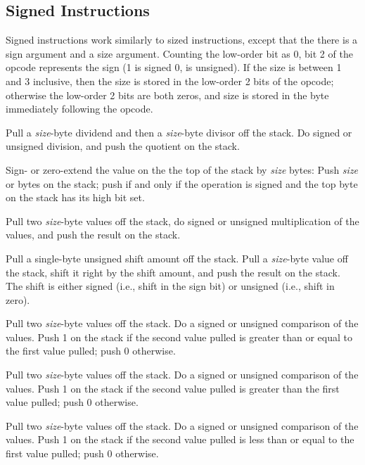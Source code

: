 \documentclass[10pt]{article}
\begin{document}
\subsection{Signed Instructions}

Signed instructions work similarly to sized instructions, except that
the there is a sign argument and a size argument.  Counting the
low-order bit as 0, bit 2 of the opcode represents the sign (1 is
signed 0, is unsigned).  If the size is between 1 and 3 inclusive,
then the size is stored in the low-order 2 bits of the opcode;
otherwise the low-order 2 bits are both zeros, and size is stored in
the byte immediately following the opcode.

 Pull a \emph{size}-byte
dividend and then a \emph{size}-byte divisor off the stack.  Do signed
or unsigned division, and push the quotient on the stack.

 Sign- or zero-extend the
value on the the top of the stack by \emph{size} bytes: Push
\emph{size}  or  bytes on the stack; push
 if and only if the operation is signed and the top byte on
the stack has its high bit set.

 Pull two \emph{size}-byte
values off the stack, do signed or unsigned multiplication of the
values, and push the result on the stack.

 Pull a single-byte
unsigned shift amount off the stack.  Pull a \emph{size}-byte value
off the stack, shift it right by the shift amount, and push the result
on the stack.  The shift is either signed (i.e., shift in the sign
bit) or unsigned (i.e., shift in zero).

 Pull two
\emph{size}-byte values off the stack. Do a signed or unsigned
comparison of the values.  Push 1 on the stack if the second value
pulled is greater than or equal to the first value pulled; push 0
otherwise.

 Pull two
\emph{size}-byte values off the stack. Do a signed or unsigned
comparison of the values.  Push 1 on the stack if the second value
pulled is greater than the first value pulled; push 0 otherwise.

 Pull two
\emph{size}-byte values off the stack. Do a signed or unsigned
comparison of the values.  Push 1 on the stack if the second value
pulled is less than or equal to the first value pulled; push 0
otherwise.
\end{document}
